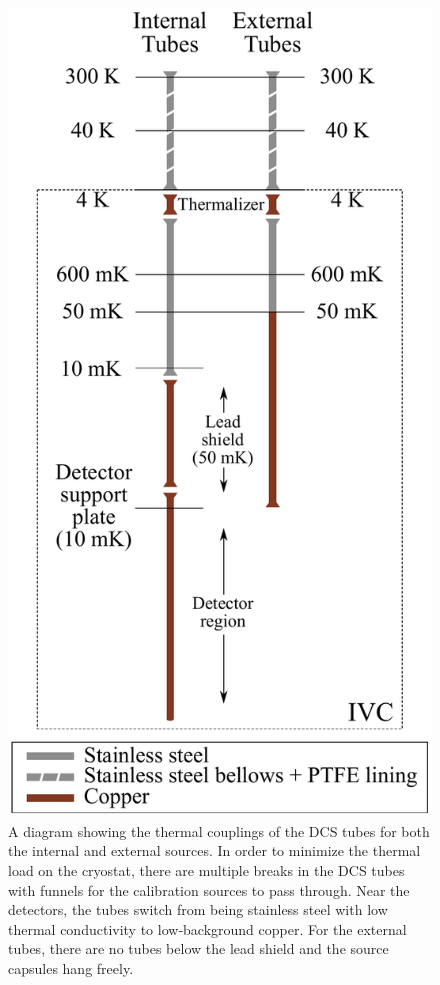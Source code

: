 \begin{figure}[htbp]
    \centering
    \includegraphics[height=0.4\paperheight]{Figures/thermal_coupling.pdf}
    \caption[A diagram showing the thermal couplings of the DCS tubes for both the internal and external sources.]
    {A diagram showing the thermal couplings of the DCS tubes for both the internal and external sources.
    In order to minimize the thermal load on the cryostat, there are multiple breaks in the DCS tubes with funnels for the calibration sources to pass through.
    Near the detectors, the tubes switch from being stainless steel with low thermal conductivity to low-background copper.
    For the external tubes, there are no tubes below the lead shield and the source capsules hang freely.}
    \label{fig:dcs_thermal_coupling}
\end{figure}

